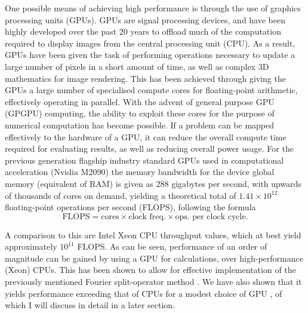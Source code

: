 One possible means of achieving high performance is through the use of graphics processing units (GPUs). GPUs are signal processing devices, and have been highly developed over the past 20 years to offload much of the computation required to display images from the central processing unit (CPU). As a result, GPUs have been given the task of performing operations necessary to update a large number of pixels in a short amount of time, as well as complex 3D mathematics for image rendering. This has been achieved through giving the GPUs a large number of specialised compute cores for floating-point arithmetic, effectively operating in parallel. With the advent of general purpose GPU (GPGPU) computing, the ability to exploit these cores for the purpose of numerical computation has become possible. If a problem can be mapped effectively to the hardware of a GPU, it can reduce the overall compute time required for evaluating results, as well as reducing overall power usage. For the previous generation flagship industry standard GPUs used in computational acceleration (Nvidia M2090) the memory bandwidth for the device global memory (equivalent of RAM) is given as 288 gigabytes per second, with upwards of thousands of cores on demand, yielding a theoretical total of $1.41\times10^{12}$ floating-point operations per second (FLOPS), following the formula
\begin{equation}
    \text{FLOPS} = \text{cores}\times\text{clock freq.}\times\text{ops. per clock cycle}.
\end{equation}

A comparison to this are Intel Xeon CPU throughput values, which at best yield approximately $10^{11}$ FLOPS. As can be seen, performance of an order of magnitude can be gained by using a GPU for calculations, over high-performance (Xeon) CPUs. This has been shown to allow for effective implementation of the previously mentioned Fourier split-operator method \cite{Num:Bauke_cpc_2011}. We have also shown that it yields performance exceeding that of CPUs for a modest choice of GPU \cite{AO:Morgan_ORiordan_pra_2013}, of which I will discuss in detail in a later section.

